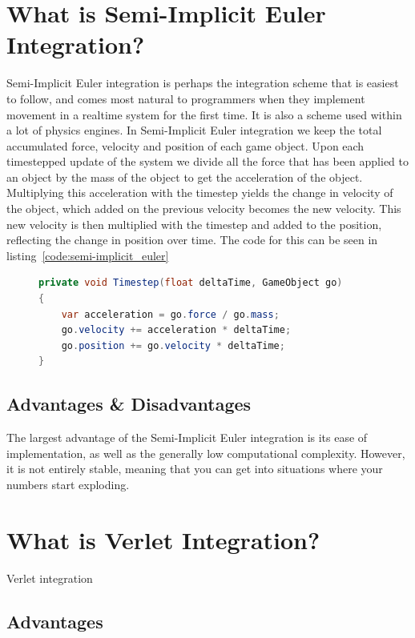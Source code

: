 \section{What is Semi-Implicit Euler Integration?}
Semi-Implicit Euler integration is perhaps the integration scheme that is easiest to follow, and comes most natural to programmers when they implement
movement in a realtime system for the first time. It is also a scheme used within a lot of physics engines\cite{gafferongames_integration}.
In Semi-Implicit Euler integration we keep the total accumulated force, velocity and position of each game object.
Upon each timestepped update of the system we divide all the force that has been applied to an object by the mass of the object to get the acceleration of the object.
Multiplying this acceleration with the timestep yields the change in velocity of the object, which added on the previous velocity becomes the new velocity.
This new velocity is then multiplied with the timestep and added to the position, reflecting the change in position over time.
The code for this can be seen in listing~\ref{code:semi-implicit_euler}

\begin{figure}
\begin{lstlisting}[label={code:semi-implicit_euler},language=csharp,caption={Semi-Implicit Euler Integration}]
private void Timestep(float deltaTime, GameObject go)
{
    var acceleration = go.force / go.mass;
    go.velocity += acceleration * deltaTime;
    go.position += go.velocity * deltaTime;
}
\end{lstlisting}
\end{figure}

\subsection{Advantages \& Disadvantages}
The largest advantage of the Semi-Implicit Euler integration is its ease of implementation, as well as the generally low computational complexity.
However, it is not entirely stable, meaning that you can get into situations where your numbers start exploding.

\section{What is Verlet Integration?}
Verlet integration 
\subsection{Advantages}
